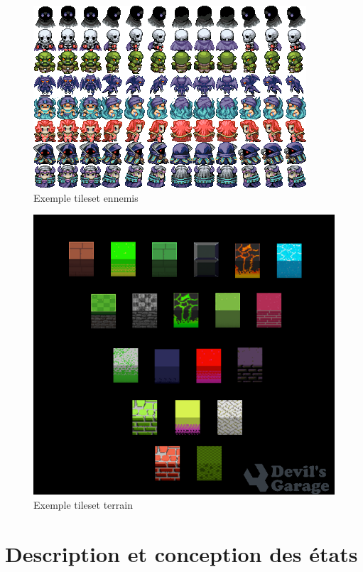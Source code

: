 \documentclass[a4paper,12pt]{article}
\begin{document}
    \begin{figure}[ht]
        \centering
        \includegraphics{monsters-32x32.png}
        \caption{Exemple tileset ennemis}
    \end{figure}
    
    \begin{figure}[ht]
        \centering
        \includegraphics[width=\textwidth]{field.png}
        \caption{Exemple tileset terrain}
    \end{figure}


\clearpage
\section{Description et conception des états}
\end{document}
